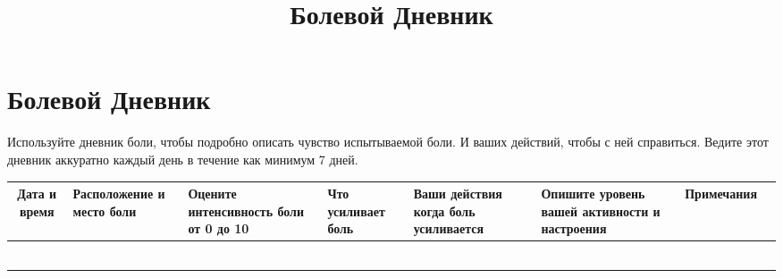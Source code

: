 \documentclass{worksheet}
\title{Болевой Дневник}
\begin{document}
\section*{\huge{Болевой Дневник}}

\begin{flushleft}
{Используйте дневник боли, чтобы подробно описать чувство испытываемой боли. И
ваших действий, чтобы с ней справиться. Ведите этот дневник аккуратно каждый день в течение как минимум 7 дней. }
\end{flushleft}

\begin{table}[htbp]
\begin{center}
\renewcommand{\arraystretch}{1.8}
\begin{tabularx}{\textwidth}{|>{\small}c|Y|Y|Y|Y|Y|Y|Y|}
\hline
\textbf{Дата и время} & \textbf{Расположение и место боли} & \textbf{Оцените
  интенсивность боли от 0 до 10} & \textbf{Что усиливает боль} & \textbf{Ваши
  действия когда боль усиливается} & \textbf{Опишите уровень вашей активности и
  настроения} & \textbf{Примечания} \\
\hline
 & & & & & &  \\[26pt]
\hline
 & & & & & &  \\[26pt]
\hline
 & & & & & &  \\[26pt]
\hline
 & & & & & &  \\[26pt]
\hline
 & & & & & &  \\[26pt]
\hline
 & & & & & &  \\[26pt]
\hline
\end{tabularx}
\end{center}
\label{tab:activity_diary}
\end{table}
\end{document}
